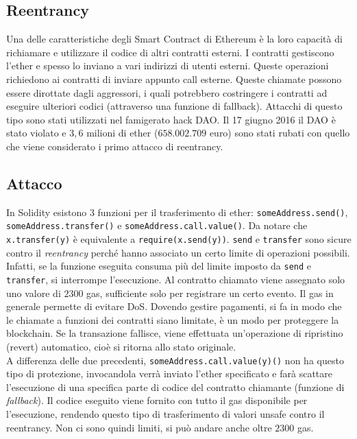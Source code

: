 \subsection{Reentrancy}

Una delle caratteristiche degli Smart Contract di Ethereum è la loro capacità di
richiamare e utilizzare il codice di altri contratti esterni. I contratti
gestiscono l'ether e spesso lo inviano a
vari indirizzi di utenti esterni. Queste operazioni richiedono ai contratti di
inviare appunto call esterne.
Queste chiamate possono essere dirottate dagli aggressori, i quali potrebbero
costringere i contratti ad eseguire ulteriori codici
(attraverso una funzione di fallback). Attacchi di questo
tipo sono stati utilizzati nel famigerato hack DAO.
Il 17 giugno 2016 il DAO è stato violato e $3,6$ milioni di ether ($658.002.709$ euro)
sono stati rubati con quello che viene considerato i primo attacco di reentrancy.

\subsection{Attacco}

In Solidity esistono 3 funzioni per il trasferimento di ether: \verb|someAddress.send()|,
\verb|someAddress.transfer()| e \verb|someAddress.call.value()|.
Da notare che \verb|x.transfer(y)| è equivalente a \verb|require(x.send(y))|.
\verb|send| e \verb|transfer| sono sicure contro il \textit{reentrancy} perché
hanno associato un certo limite di operazioni possibili.
Infatti, se la funzione eseguita consuma più del limite imposto da \verb|send| e \verb|transfer|,
si interrompe l'esecuzione.
Al contratto chiamato viene assegnato solo uno valore di $2300$
gas, sufficiente solo per registrare un certo evento.
Il gas in generale permette di evitare DoS. Dovendo gestire pagamenti,
si fa in modo che le chiamate a funzioni dei contratti siano limitate, è un modo
per proteggere la blockchain.
Se la transazione fallisce, viene effettuata un'operazione di ripristino (revert)
automatico, cioè si ritorna allo stato originale.\\
A differenza delle due precedenti, \verb|someAddress.call.value(y)()| non ha questo
tipo di protezione, invocandola verrà inviato
l'ether specificato e farà scattare
l'esecuzione di una specifica parte di codice del contratto chiamante
(funzione di \textit{fallback}).
Il codice eseguito viene fornito con tutto il gas
disponibile per l'esecuzione, rendendo
questo tipo di trasferimento di valori unsafe contro il reentrancy.
Non ci sono quindi limiti, si può andare anche oltre $2300$ gas.

